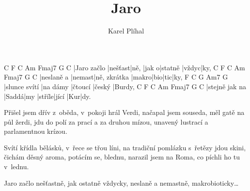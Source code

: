 \documentclass{song}
\author{Karel Plíhal}
\title{Jaro}
\begin{document}
\strophe
C           F       C    Am    Fmaj7   G     C
|Jaro začlo |nešťast|ně, |jak o|statně |vždyc|ky,
C          F      C            Am    Fmaj7 G C
|neslaně a |nemast|ně, zkrátka |makro|bio|tic|ky,
F             C        G       Am7    G
|slunce svítí |na dámy |čtoucí |český |Burdy,
C              F     C   Am     Fmaj7 G  C
|stejně jak na |Saddá|my |stříle|jící |Kur|dy. 
\endstrophe

\strophe*
Přišel jsem dřív z~oběda, v~pokoji hrál Verdi, 
načapal jsem souseda, měl gatě na půl žerdi, 
jdu do polí za prací a za druhou mízou, 
unavený lustrací a parlamentnou krízou.
\endstrophe

\strophe*
Svítí křídla bělásků, v~řece se třou líni, 
na tradiční pomlázku s~řetězy jdou skini, 
čichám děsný aroma, potácím se, blednu, 
narazil jsem na Roma, co píchli ho tu v~lednu. 
\endstrophe

\strophe*
Jaro začlo nešťastně, jak ostatně vždycky,
neslaně a nemastně, makrobioticky\ldots
\endstrophe
\end{document}
